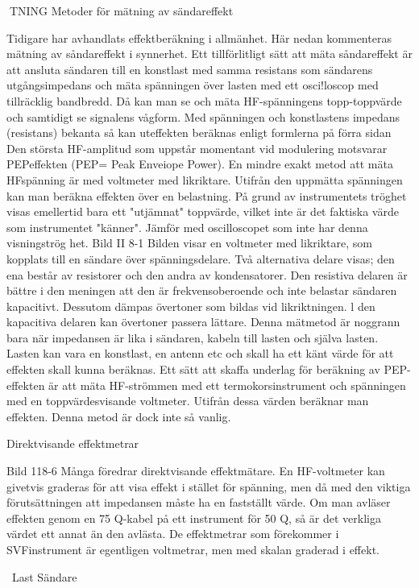 TNING
Metoder för mätning av sändareffekt

Tidigare har avhandlats effektberäkning i
allmänhet. Här nedan kommenteras mätning av såndareffekt i synnerhet.
Ett tillförlitligt sätt att mäta såndareffekt är
att ansluta sändaren till en konstlast med
samma resistans som sändarens utgångsimpedans och mäta spänningen över lasten
med ett osci!loscop med tillräcklig bandbredd. Då kan man se och mäta HF-spänningens topp-toppvärde och samtidigt se
signalens vågform.
Med spänningen och konstlastens impedans (resistans) bekanta så kan uteffekten
beräknas enligt formlerna på förra sidan
Den största HF-amplitud som uppstår
momentant vid modulering motsvarar PEPeffekten (PEP= Peak Enveiope Power).
En mindre exakt metod att mäta HFspänning är med voltmeter med likriktare.
Utifrån den uppmätta spänningen kan man
beräkna effekten över en belastning. På
grund av instrumentets tröghet visas emellertid bara ett "utjämnat" toppvärde, vilket
inte är det faktiska värde som instrumentet
"känner". Jämför med oscilloscopet som inte
har denna visningströg het.
Bild II 8-1
Bilden visar en voltmeter med likriktare,
som kopplats till en sändare över spänningsdelare. Två alternativa delare visas; den ena
består av resistorer och den andra av kondensatorer.
Den resistiva delaren är bättre i den meningen att den är frekvensoberoende och
inte belastar sändaren kapacitivt. Dessutom
dämpas övertoner som bildas vid likriktningen. l den kapacitiva delaren kan övertoner
passera lättare.
Denna mätmetod är noggrann bara när
impedansen är lika i sändaren, kabeln till
lasten och själva lasten. Lasten kan vara en
konstlast, en antenn etc och skall ha ett känt
värde för att effekten skall kunna beräknas.
Ett sätt att skaffa underlag för beräkning
av PEP-effekten är att mäta HF-strömmen
med ett termokorsinstrument och spänningen med en toppvärdesvisande voltmeter.
Utifrån dessa värden beräknar man effekten. Denna metod är dock inte så vanlig.

Direktvisande effektmetrar

Bild 118-6
Många föredrar direktvisande effektmätare.
En HF-voltmeter kan givetvis graderas för
att visa effekt i stället för spänning, men då
med den viktiga förutsättningen att impedansen måste ha en fastställt värde.
Om man avläser effekten genom en 75
Q-kabel på ett instrument för 50 Q, så är det
verkliga värdet ett annat än den avlästa.
De effektmetrar som förekommer i SVFinstrument är egentligen voltmetrar, men
med skalan graderad i effekt.

~Last
Sändare~

